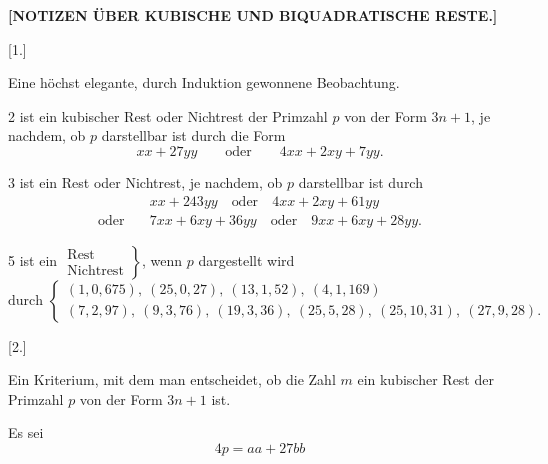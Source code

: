 \clearpage{}
\begin{center}\bfseries [NOTIZEN ÜBER KUBISCHE UND BIQUADRATISCHE RESTE.]\end{center}
\begin{center}[1.]\par\smallskip Eine höchst elegante, durch Induktion gewonnene Beobachtung.\end{center}
\noindent\hspace*{\parindent}2 ist ein kubischer Rest oder Nichtrest der Primzahl $p$ von der Form $3n+1$, je nachdem, ob $p$ darstellbar ist durch die Form
\[xx+27yy\qquad\text{oder}\qquad4xx+2xy+7yy.\]
\par\noindent\hspace*{\parindent}3 ist ein Rest oder Nichtrest, je nachdem, ob $p$ darstellbar ist durch
\[\begin{aligned} &xx+243yy\quad\text{oder}\quad4xx+2xy+61yy\\
\text{oder}\quad&7xx+6xy+36yy\quad\text{oder}\quad9xx+6xy+28yy.\end{aligned}\]
\par\noindent\hspace*{\parindent}5 ist ein $\left.\begin{array}{l}\text{Rest}\\\text{Nichtrest}\end{array}\right\}$, wenn $p$ dargestellt wird
\begingroup\small
\[\text{durch }\left\{\begin{array}{l}(1,0,675),\ (25,0,27),\ (13,1,52),\ (4,1,169)\\
(7,2,97),\ (9,3,76),\ (19,3,36),\ (25,5,28),\ (25,10,31),\ (27,9,28).\end{array}\right.\]
\endgroup
\begin{center}[2.]\end{center}
\noindent\hspace*{\parindent}Ein Kriterium, mit dem man entscheidet, ob die Zahl $m$ ein kubischer Rest der Primzahl $p$ von der Form $3n+1$ ist.

Es sei
\[4p=aa+27bb\]

